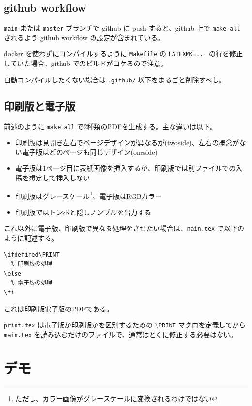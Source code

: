 \section{github workflow}

\verb`main` または \verb`master` ブランチで github に push すると、github 上で \verb`make all` されるよう github workflow の設定が含まれている。

docker を使わずにコンパイルするように \verb`Makefile` の \verb`LATEXMK=...` の行を修正していた場合、github でのビルドがコケるので注意。

自動コンパイルしたくない場合は \verb`.github/` 以下をまるごと削除すべし。

\section{印刷版と電子版}

前述のように \verb`make all` で2種類のPDFを生成する。主な違いは以下。

\begin{itemize}
\item 印刷版は見開き左右でページデザインが異なるが(twoside)、左右の概念がない電子版はどのページも同じデザイン(oneside)
\item 電子版は1ページ目に表紙画像を挿入するが、印刷版では別ファイルでの入稿を想定して挿入しない
\item 印刷版はグレースケール\footnote{ただし、カラー画像がグレースケールに変換されるわけではない}、電子版はRGBカラー
\item 印刷版ではトンボと隠しノンブルを出力する
\end{itemize}

これ以外に電子版、印刷版で異なる処理をさせたい場合は、\verb`main.tex` で以下のように記述する。

\begin{lstlisting}
\ifdefined\PRINT
  % 印刷版の処理
\else
  % 電子版の処理
\fi
\end{lstlisting}

これは\ifdefined\PRINT 印刷版\else 電子版\fi のPDFである。

\verb`print.tex` は電子版か印刷版かを区別するための \verb`\PRINT` マクロを定義してから \verb`main.tex` を読み込むだけのファイルで、通常はとくに修正する必要はない。


\chapter{デモ}

